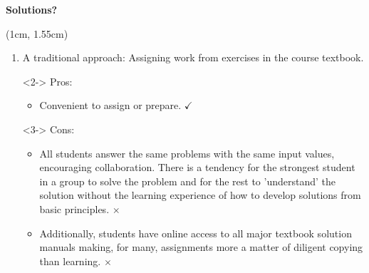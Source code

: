 \documentclass[11pt,xcolor={svgnames, x11names}]{beamer}
\begin{document}
\begin{frame}{\bf Solutions?}


	\begin{textblock*}{0.95\textwidth}(1cm, 1.55cm)
		\begin{enumerate}			
			\item<1-| alert@1-> A traditional approach: Assigning work from exercises in the course textbook. 
			\item[]<2-> \textcolor{myGreen}{Pros}:
			\begin{itemize}
				\item<2-| alert@2> Convenient to assign or prepare. \textcolor{myGreen}{\large $\bm \checkmark$}
			\end{itemize}
			\item[]<3-> \textcolor{saitMaroon}{Cons}:
			\begin{itemize}				
				\item<3-| alert@3> All students answer the same problems with the same input values, encouraging collaboration. There is a tendency for the strongest student in a group to solve the problem and for the rest to 'understand' the solution without the learning experience of how to develop solutions from basic principles.  \textcolor{saitMaroon}{\large $\bm \times $}  \parm
				\item<4| alert@4> Additionally, students have online access to all major textbook solution manuals making, for many, assignments more a matter of diligent copying than learning. \textcolor{saitMaroon}{\large $\bm \times $}
			\end{itemize}
		\end{enumerate}		
	\end{textblock*}
\end{frame}	
\end{document}
